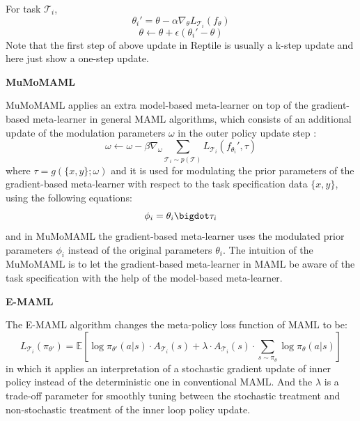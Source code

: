 \documentclass{article}
\begin{document}
For task $\mathcal{T}_i$, 
\begin{equation}
        \theta_i' = \theta - \alpha \nabla_{\theta}L_{\mathcal{T}_i}(f_{\theta})
\end{equation}
\begin{equation}
   \theta \leftarrow \theta + \epsilon ( \theta_i'-\theta)
\end{equation}
Note that the first step of above update in Reptile is usually a k-step update and here just show a one-step update. 

\textbf{MuMoMAML}

MuMoMAML \cite{vuorio2018toward} applies an extra model-based meta-learner on top of the gradient-based meta-learner in general MAML algorithms, which consists of an additional update of the modulation parameters $\omega$ in the outer policy update step :
\begin{equation}
    \omega \leftarrow \omega - \beta\nabla_{\omega}\sum_{\mathcal{T}_i\sim p(\mathcal{T})}L_{\mathcal{T}_i}(f_\theta_i', \tau)
\end{equation}
where $\tau = g(\{x,y\}; \omega)$ and it is used for modulating the prior parameters of the gradient-based meta-learner with respect to the task specification data $\{x,y\}$, using the following equations:
\begin{equation}
    \phi_i = \theta_i \bigdot \tau_i 
\end{equation}
and in MuMoMAML the gradient-based meta-learner uses the
modulated prior parameters $\phi_i$ instead of the original parameters $\theta_i$. The intuition of the MuMoMAML is to let the gradient-based meta-learner in MAML be aware of the task specification with the help of the model-based meta-learner. 

\textbf{E-MAML}

The E-MAML \cite{stadie2018some} algorithm changes the meta-policy loss function of MAML to be:
\begin{equation}
     L_{\mathcal{T}_i}(\pi_{\theta '}) = \mathbb{E}[\log \pi_{\theta '}(a|s)\cdot A_{\mathcal{T}_i}(s)
     + \lambda\cdot A_{\mathcal{T}_i}(s) \cdot \sum_{s\sim \pi_\theta}\log \pi_\theta (a|s)]
\end{equation}
in which it applies an interpretation of a stochastic gradient update of inner policy instead of the deterministic one in conventional MAML. And the $\lambda$ is a trade-off parameter for smoothly tuning between the stochastic treatment and non-stochastic treatment of the inner loop policy update.
\end{document}
